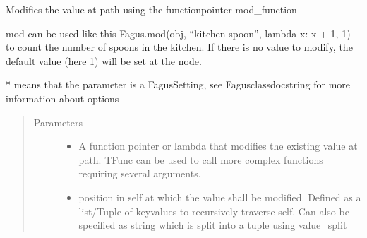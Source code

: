 \documentclass[a4paper,10pt,english]{sphinxmanual}
\begin{document}
\begin{fulllineitems}
\begin{fulllineitems}
\label{\detokenize{fagus.fagus:fagus.fagus.Fagus.mod}}
\pysigstartsignatures
{}
\pysigstopsignatures
\sphinxAtStartPar
Modifies the value at path using the function\sphinxhyphen{}pointer mod\_function

\sphinxAtStartPar
mod can be used like this Fagus.mod(obj, “kitchen spoon”, lambda x: x + 1, 1) to count the number of spoons in
the kitchen. If there is no value to modify, the default value (here 1) will be set at the node.

\sphinxAtStartPar
* means that the parameter is a Fagus\sphinxhyphen{}Setting, see Fagus\sphinxhyphen{}class\sphinxhyphen{}docstring for more information about options
\begin{quote}\begin{description}
\item[{Parameters}] \leavevmode\begin{itemize}
\item {}
\sphinxAtStartPar
{} \textendash{} A function pointer or lambda that modifies the existing value at path. TFunc can be used to
call more complex functions requiring several arguments.

\item {}
\sphinxAtStartPar
{} \textendash{} position in self at which the value shall be modified. Defined as a list/Tuple of key\sphinxhyphen{}values to
recursively traverse self. Can also be specified as string which is split into a tuple using value\_split


\end{itemize}
\end{description}
\end{quote}
\end{fulllineitems}
\end{fulllineitems}
\end{document}
